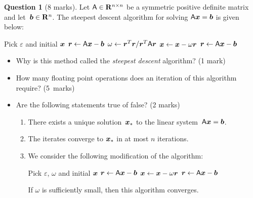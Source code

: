 \documentclass[11pt]{article}
\theoremstyle{definition}
\newtheorem{question}{Question}
\begin{document}
\newpage
\begin{question}
    [8 marks]
    Let $\mathsf A \in \mathbf R^{n \times n}$ be a symmetric positive definite matrix and let~$\mathbf{\boldsymbol{b}} \in \mathbf R^{n}$.
    The steepest descent algorithm for solving $\mathsf A \mathbf{\boldsymbol{x}} = \mathbf{\boldsymbol{b}}$ is given below:

    \begin{center}
    \begin{algorithmic}
    \State Pick $\varepsilon$ and initial $\mathbf{\boldsymbol{x}}$%
    \State $\mathbf{\boldsymbol{r}} \gets \mathsf A \mathbf{\boldsymbol{x}} - \mathbf{\boldsymbol{b}}$%
        \State $\omega \gets \mathbf{\boldsymbol{r}}^T \mathbf{\boldsymbol{r}}/\mathbf{\boldsymbol{r}}^T \mathsf A \mathbf{\boldsymbol{r}}$
        \State $\mathbf{\boldsymbol{x}} \gets \mathbf{\boldsymbol{x}} - \omega \mathbf{\boldsymbol{r}}$
        \State $\mathbf{\boldsymbol{r}} \gets \mathsf A \mathbf{\boldsymbol{x}} - \mathbf{\boldsymbol{b}}$
    \EndWhile
    \end{algorithmic}
    \end{center}

    \noindent
    \begin{itemize}
        \item
            Why is this method called the \emph{steepest descent} algorithm? (1 mark)

        \item
            How many floating point operations does an iteration of this algorithm require? (5~marks)

        \item Are the following statements true of false? (2 marks)
        \begin{enumerate}
            \item
                There exists a unique solution~$\mathbf{\boldsymbol{x}}_*$ to the linear system~\( \mathsf A \mathbf{\boldsymbol{x}} = \mathbf{\boldsymbol{b}} \).

            \item
                The iterates converge to $\mathbf{\boldsymbol{x}}_*$ in at most $n$ iterations.

            \item
                We consider the following modification of the algorithm:
                \begin{center}
                \begin{algorithmic}
                \State Pick $\varepsilon$, $\omega$ and initial $\mathbf{\boldsymbol{x}}$%
                \State $\mathbf{\boldsymbol{r}} \gets \mathsf A \mathbf{\boldsymbol{x}} - \mathbf{\boldsymbol{b}}$%
                    \State $\mathbf{\boldsymbol{x}} \gets \mathbf{\boldsymbol{x}} - \omega \mathbf{\boldsymbol{r}}$
                    \State $\mathbf{\boldsymbol{r}} \gets \mathsf A \mathbf{\boldsymbol{x}} - \mathbf{\boldsymbol{b}}$
                \EndWhile
                \end{algorithmic}
                \end{center}
                If $\omega$ is sufficiently small, then this algorithm converges.


\end{enumerate}
\end{itemize}
\end{question}
\end{document}
